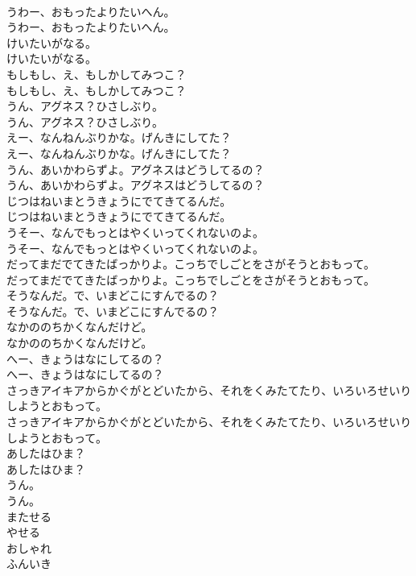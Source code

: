 \documentclass[8pt]{extreport}
\begin{document}
\begin{CJK}{UTF8}{min}
\\	うわー、おもったよりたいへん。	
\\	うわー、おもったよりたいへん。 
\\	けいたいがなる。	
\\	けいたいがなる。 
\\	もしもし、え、もしかしてみつこ？	
\\	もしもし、え、もしかしてみつこ？ 
\\	うん、アグネス？ひさしぶり。	
\\	うん、アグネス？ひさしぶり。 
\\	えー、なんねんぶりかな。げんきにしてた？	
\\	えー、なんねんぶりかな。げんきにしてた？ 
\\	うん、あいかわらずよ。アグネスはどうしてるの？	
\\	うん、あいかわらずよ。アグネスはどうしてるの？ 
\\	じつはねいまとうきょうにでてきてるんだ。	
\\	じつはねいまとうきょうにでてきてるんだ。 
\\	うそー、なんでもっとはやくいってくれないのよ。	
\\	うそー、なんでもっとはやくいってくれないのよ。 
\\	だってまだでてきたばっかりよ。こっちでしごとをさがそうとおもって。	
\\	だってまだでてきたばっかりよ。こっちでしごとをさがそうとおもって。 
\\	そうなんだ。で、いまどこにすんでるの？	
\\	そうなんだ。で、いまどこにすんでるの？ 
\\	なかののちかくなんだけど。	
\\	なかののちかくなんだけど。 
\\	へー、きょうはなにしてるの？	
\\	へー、きょうはなにしてるの？ 
\\	さっきアイキアからかぐがとどいたから、それをくみたてたり、いろいろせいりしようとおもって。	
\\	さっきアイキアからかぐがとどいたから、それをくみたてたり、いろいろせいりしようとおもって。 
\\	あしたはひま？	
\\	あしたはひま？ 
\\	うん。	
\\	うん。 
\\	またせる
\\	やせる
\\	おしゃれ
\\	ふんいき

\end{CJK}
\end{document}

